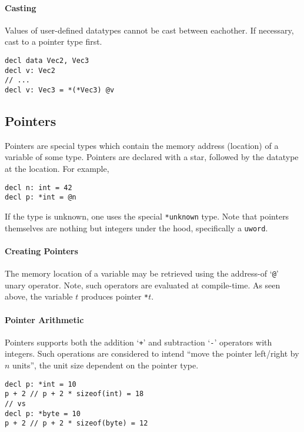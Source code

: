 \documentclass{article}
\begin{document}
\paragraph*{Casting}

Values of user-defined datatypes cannot be cast between eachother.
If necessary, cast to a pointer type first.

\begin{lstlisting}[language=CustomLang]
decl data Vec2, Vec3
decl v: Vec2
// ...
decl v: Vec3 = *(*Vec3) @v
\end{lstlisting}

\subsection{Pointers}

Pointers are special types which contain the memory address (location) of a variable of some type.
Pointers are declared with a star, followed by the datatype at the location.
For example,

\begin{lstlisting}[language=CustomLang]
decl n: int = 42
decl p: *int = @n
\end{lstlisting}

If the type is unknown, one uses the special \texttt{*unknown} type.
Note that pointers themselves are nothing but integers under the hood, specifically a \texttt{uword}.

\paragraph*{Creating Pointers}
The memory location of a variable may be retrieved using the address-of `\texttt{@}' unary operator.
Note, such operators are evaluated at compile-time.
As seen above, the variable \(t\) produces pointer \texttt{*\(t\)}.

\paragraph*{Pointer Arithmetic}
Pointers supports both the addition `\texttt{+}' and subtraction `\texttt{-}' operators with integers.
Such operations are considered to intend ``move the pointer left/right by \(n\) units'', the unit size dependent on the pointer type.

\begin{lstlisting}[language=CustomLang]
decl p: *int = 10
p + 2 // p + 2 * sizeof(int) = 18
// vs
decl p: *byte = 10
p + 2 // p + 2 * sizeof(byte) = 12
\end{lstlisting}
\end{document}
